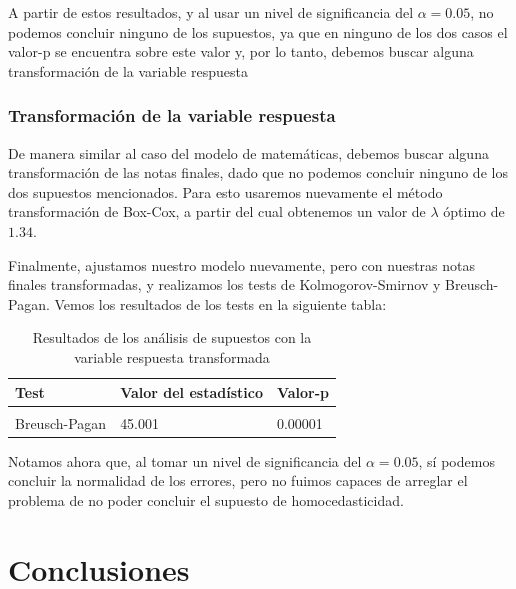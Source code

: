 \documentclass[
]{article}
\begin{document}
A partir de estos resultados, y al usar un nivel de significancia del
\(\alpha = 0.05\), no podemos concluir ninguno de los supuestos, ya que
en ninguno de los dos casos el valor-p se encuentra sobre este valor y,
por lo tanto, debemos buscar alguna transformación de la variable
respuesta

\hypertarget{transformaciuxf3n-de-la-variable-respuesta-1}{%
\subsubsection{Transformación de la variable
respuesta}\label{transformaciuxf3n-de-la-variable-respuesta-1}}

De manera similar al caso del modelo de matemáticas, debemos buscar
alguna transformación de las notas finales, dado que no podemos concluir
ninguno de los dos supuestos mencionados. Para esto usaremos nuevamente
el método transformación de Box-Cox, a partir del cual obtenemos un
valor de \(\lambda\) óptimo de \(1.34\).

Finalmente, ajustamos nuestro modelo nuevamente, pero con nuestras notas
finales transformadas, y realizamos los tests de Kolmogorov-Smirnov y
Breusch-Pagan. Vemos los resultados de los tests en la siguiente tabla:

\begin{longtable}[t]{lll}
\caption{\label{tab:resultados test por 2}Resultados de los análisis de supuestos con la variable respuesta transformada}\\
\toprule
Test & Valor del estadístico & Valor-p\\
\midrule
\cellcolor{gray!6}{Kolmogorov-Smirnov} & \cellcolor{gray!6}{0.040292} & \cellcolor{gray!6}{0.2427}\\
Breusch-Pagan & 45.001 & 0.00001\\
\bottomrule
\end{longtable}

Notamos ahora que, al tomar un nivel de significancia del
\(\alpha = 0.05\), sí podemos concluir la normalidad de los errores,
pero no fuimos capaces de arreglar el problema de no poder concluir el
supuesto de homocedasticidad.

\hypertarget{conclusiones}{%
\section{Conclusiones}\label{conclusiones}}
\end{document}
